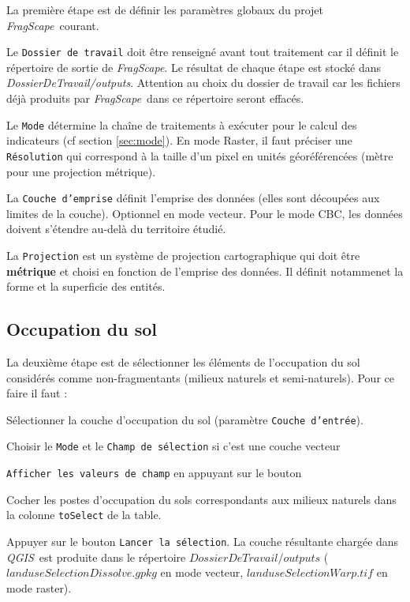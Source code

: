 \documentclass[11pt]{article}
\newcommand{\tool}{\emph{FragScape}}
\newcommand{\qgis}{\emph{QGIS}}
\let\tempone\itemize
\let\temptwo\enditemize
\renewenvironment{enumerate}{\tempone\addtolength{\itemsep}{-0.5\baselineskip}}{\temptwo}
\begin{document}
La première étape est de définir les paramètres globaux du projet \tool\ courant.

Le \texttt{Dossier de travail} doit être renseigné avant tout traitement car il définit le répertoire de sortie de \tool. Le résultat de chaque étape est stocké dans \textit{DossierDeTravail/outputs}. Attention au choix du dossier de travail car les fichiers déjà produits par \tool\ dans ce répertoire seront effacés.

Le \texttt{Mode} détermine la chaîne de traitements à exécuter pour le calcul des indicateurs (cf section \ref{sec:mode}). En mode Raster, il faut préciser une \texttt{Résolution} qui correspond à la taille d'un pixel en unités géoréférencées (mètre pour une projection métrique).

La \texttt{Couche d'emprise} définit l'emprise des données (elles sont découpées aux limites de la couche). Optionnel en mode vecteur. Pour le mode CBC, les données doivent s'étendre au-delà du territoire étudié.

La \texttt{Projection} est un système de projection cartographique qui doit être \textbf{métrique} et choisi en fonction de l'emprise des données. Il définit notammenet la forme et la superficie des entités.



\subsection{Occupation du sol}

La deuxième étape est de sélectionner les éléments de l'occupation du sol considérés comme non-fragmentants (milieux naturels et semi-naturels). Pour ce faire il faut :
\begin{enumerate}
    \item Sélectionner la couche d'occupation du sol (paramètre \texttt{Couche d'entrée}).
    \item Choisir le \texttt{Mode} et le \texttt{Champ de sélection} si c'est une couche vecteur
    \item \texttt{Afficher les valeurs de champ} en appuyant sur le bouton 
    \item Cocher les postes d'occupation du sols correspondants aux milieux naturels dans la colonne \texttt{toSelect} de la table.
    \item Appuyer sur le bouton \texttt{Lancer la sélection}. La couche résultante chargée dans \qgis\ est produite dans le répertoire $DossierDeTravail/outputs$ ($landuseSelectionDissolve.gpkg$ en mode vecteur, $landuseSelectionWarp.tif$ en mode raster).
\end{enumerate}
\end{document}
